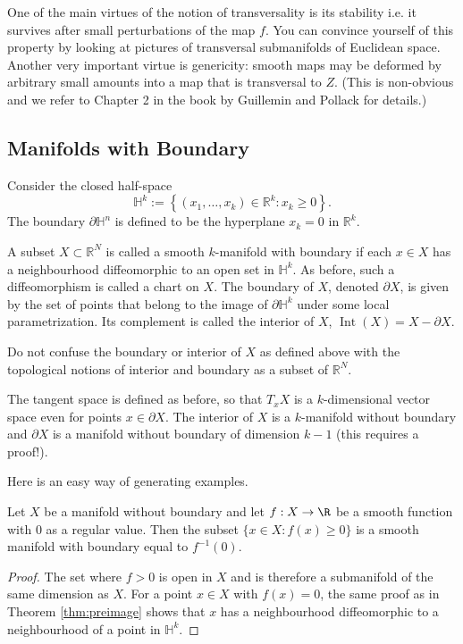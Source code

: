 One of the main virtues of the notion of transversality is its stability i.e. it survives after small perturbations of the map $f$. You can convince yourself of this property by looking at pictures of transversal submanifolds of Euclidean space. Another very important virtue is genericity: smooth maps may be deformed by arbitrary small amounts into a map that is transversal to $Z$. (This is non-obvious and we refer to Chapter 2 in the book by Guillemin and Pollack for details.)

\subsection{Manifolds with Boundary}

Consider the closed half-space
$$
\mathbb{H}^{k}:=\left\{\left(x_{1}, \ldots, x_{k}\right) \in \mathbb{R}^{k}: x_{k} \geq 0\right\}.
$$
The boundary $\partial \mathbb{H}^{n}$ is defined to be the hyperplane $x_{k}=0$ in $\mathbb{R}^{k}$.

\begin{definition}
    A subset $X \subset \mathbb{R}^{N}$ is called a smooth $k$-manifold with boundary if each $x \in X$ has a neighbourhood diffeomorphic to an open set in $\mathbb{H}^{k}$. As before, such a diffeomorphism is called a chart on $X$. The boundary of $X$, denoted $\partial X$, is given by the set of points that belong to the image of $\partial \mathbb{H}^{k}$ under some local parametrization. Its complement is called the interior of $X$, $\operatorname{Int}(X)=X-\partial X$.
\end{definition}

\begin{remark}[Warning]
    Do not confuse the boundary or interior of $X$ as defined above with the topological notions of interior and boundary as a subset of $\mathbb{R}^{N}$.
\end{remark}


The tangent space is defined as before, so that $T_{x} X$ is a $k$-dimensional vector space even for points $x \in \partial X$. The interior of $X$ is a $k$-manifold without boundary and $\partial X$ is a manifold without boundary of dimension $k-1$ (this requires a proof!).

Here is an easy way of generating examples.

\begin{lemma}\label{lem:sublevel}
    Let $X$ be a manifold without boundary and let $f: X \rightarrow \R$ be a smooth function with $0$ as a regular value. Then the subset $\{x \in X: f(x) \geq 0\}$ is a smooth manifold with boundary equal to $f^{-1}(0)$.
\end{lemma}
\begin{proof}
    The set where $f>0$ is open in $X$ and is therefore a submanifold of the same dimension as $X$. For a point $x \in X$ with $f(x)=0$, the same proof as in Theorem \ref{thm:preimage} shows that $x$ has a neighbourhood diffeomorphic to a neighbourhood of a point in $\mathbb{H}^{k}$.
\end{proof}

